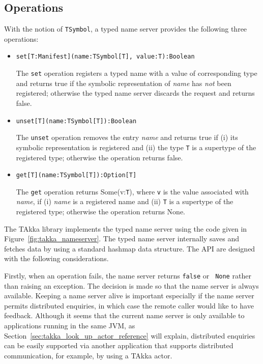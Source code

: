 \subsection{Operations}

With the notion of {\tt TSymbol}, a typed name server provides 
the following three operations:
\begin{itemize}
  \item {\tt set[T:Manifest](name:TSymbol[T], value:T):Boolean}

The {\tt set} operation registers a typed name with a value of corresponding 
type and returns true if the symbolic representation of {\it name} has {\it 
not} been registered; otherwise the typed name server discards the request and
returns false.


  \item {\tt unset[T](name:TSymbol[T]):Boolean}

The {\tt unset} operation removes the entry {\it name} and returns true if (i) 
its symbolic representation is registered and (ii) the type {\tt T} is a 
supertype of the registered type; otherwise the operation returns false.

  \item {\tt get[T](name:TSymbol[T]):Option[T]}

The {\tt get} operation returns Some(v:{\tt T}), where {\tt v} is the value 
associated with {\it name}, if (i) {\it name} is a registered name and (ii) 
{\tt T} is a supertype of the registered type; otherwise the operation returns 
None.
\end{itemize}

The TAkka library implements the typed name server using the code given in 
Figure~\ref{fig:takka_nameserver}.  The typed name server internally saves and 
fetches data by using a standard hashmap data structure.  The API are designed 
with the following considerations.  

Firstly, when an operation fails, the name server returns {\tt false} or {\tt 
None} rather than raising an exception.  The decision is made so that the name 
server is always available.  Keeping a name server alive is important 
especially if the name server permits distributed enquiries, in which case the 
remote caller would like to have feedback.  Although it seems that the 
current name server is only available to applications running in the same JVM, 
as Section~\ref{sec:takka_look_up_actor_reference} will explain, distributed 
enquiries can be easily supported via another application that supports 
distributed communication, for example, by using a TAkka actor.

